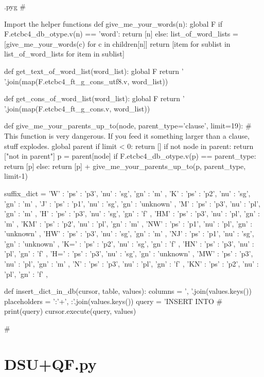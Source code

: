 \documentclass{report}
\makeatletter
\newenvironment{python}{%
  \VerbatimEnvironment
  \minted@resetoptions
  \setkeys{minted@opt}{}
      \begin{VerbatimOut}{\jobname.pyg}}
{%
      \end{VerbatimOut}
      \minted@pygmentize{python}
      \DeleteFile{\jobname.pyg}}
\makeatother
\begin{document}
\begin{python}
#{{{ Import the helper functions
def give_me_your_words(n):
        global F
        if F.etcbc4_db_otype.v(n) == 'word':
                return [n]
        else:
            list_of_word_lists = [give_me_your_words(c) for c in children[n]]
            return [item for sublist in list_of_word_lists for item in sublist]

def get_text_of_word_list(word_list):
        global F
        return ' '.join(map(F.etcbc4_ft_g_cons_utf8.v, word_list))

def get_cons_of_word_list(word_list):
        global F
        return ' '.join(map(F.etcbc4_ft_g_cons.v, word_list))

def give_me_your_parents_up_to(node, parent_type='clause', limit=19):
    # This function is very dangerous. If you feed it something larger than a clause, stuff explodes.
        global parent
        if limit < 0:
                return []
        if not node in parent:
                return ["not in parent"]
        p = parent[node]
        if F.etcbc4_db_otype.v(p) == parent_type:
                return [p]
        else:
                return [p] + give_me_your_parents_up_to(p, parent_type, limit-1)

suffix_dict = {
'W'   : { 'ps' : 'p3', 'nu' : 'sg', 'gn' : 'm' },
'K'   : { 'ps' : 'p2', 'nu' : 'sg', 'gn' : 'm' },
'J'   : { 'ps' : 'p1', 'nu' : 'sg', 'gn' : 'unknown' },
'M'   : { 'ps' : 'p3', 'nu' : 'pl', 'gn' : 'm' },
'H'   : { 'ps' : 'p3', 'nu' : 'sg', 'gn' : 'f' },
'HM'  : { 'ps' : 'p3', 'nu' : 'pl', 'gn' : 'm' },
'KM'  : { 'ps' : 'p2', 'nu' : 'pl', 'gn' : 'm' },
'NW'  : { 'ps' : 'p1', 'nu' : 'pl', 'gn' : 'unknown' },
'HW'  : { 'ps' : 'p3', 'nu' : 'sg', 'gn' : 'm' },
'NJ'  : { 'ps' : 'p1', 'nu' : 'sg', 'gn' : 'unknown' },
'K='  : { 'ps' : 'p2', 'nu' : 'sg', 'gn' : 'f' },
'HN'  : { 'ps' : 'p3', 'nu' : 'pl', 'gn' : 'f' },
'H='  : { 'ps' : 'p3', 'nu' : 'sg', 'gn' : 'unknown' },
'MW'  : { 'ps' : 'p3', 'nu' : 'pl', 'gn' : 'm' },
'N'   : { 'ps' : 'p3', 'nu' : 'pl', 'gn' : 'f' },
'KN'  : { 'ps' : 'p2', 'nu' : 'pl', 'gn' : 'f' },
}

def insert_dict_in_db(cursor, table, values):
        columns = ', '.join(values.keys())
        placeholders = ':'+', :'.join(values.keys())
        query = 'INSERT INTO %
#        print(query)
        cursor.execute(query, values)

#}}}
\end{python}

\chapter{DSU+QF.py}
\lstset{language=python,basicstyle=\ttfamily}
\end{document}
